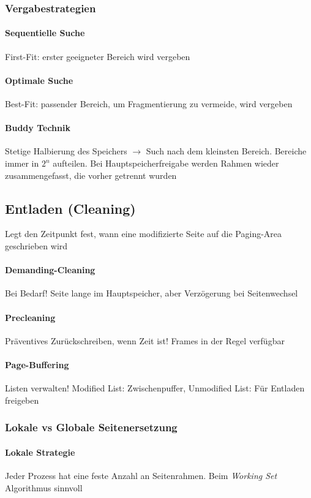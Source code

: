 \documentclass[11pt,a4paper,landscape]{article}
\begin{document}
\begin{multicols*}{3}
	\subsubsection{Vergabestrategien}
	\paragraph{Sequentielle Suche} First-Fit: erster geeigneter Bereich wird vergeben
	\paragraph{Optimale Suche} Best-Fit: passender Bereich, um Fragmentierung zu vermeide, wird vergeben
	\paragraph{Buddy Technik} Stetige Halbierung des Speichers $\rightarrow$ Such nach dem kleinsten Bereich. Bereiche immer in $2^n$ aufteilen. Bei Hauptspeicherfreigabe werden Rahmen wieder zusammengefasst, die vorher getrennt wurden
	\subsection{Entladen (Cleaning)}
	Legt den Zeitpunkt fest, wann eine modifizierte Seite auf die Paging-Area geschrieben wird
	\paragraph{Demanding-Cleaning} Bei Bedarf! Seite lange im Hauptspeicher, aber Verzögerung bei Seitenwechsel
	\paragraph{Precleaning} Präventives Zurückschreiben, wenn Zeit ist! Frames in der Regel verfügbar
	\paragraph{Page-Buffering} Listen verwalten! Modified List: Zwischenpuffer, Unmodified List: Für Entladen freigeben
	\subsubsection{Lokale vs Globale Seitenersetzung}
	\paragraph{Lokale Strategie} Jeder Prozess hat eine feste Anzahl an Seitenrahmen. Beim \textit{Working Set} Algorithmus sinnvoll

\end{multicols*}
\end{document}
